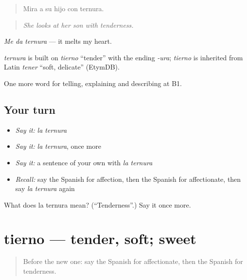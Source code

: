 \begin{quote}
Mira a su hijo con ternura.
\end{quote}

\begin{quote}
\emph{She looks at her son with tenderness.}
\end{quote}

\emph{Me da ternura} — it melts my heart.

\begin{cousinweb}
\emph{ternura} is built on \emph{tierno} \textquotedblleft{}tender\textquotedblright{} with the ending \emph{-ura}; \emph{tierno} is inherited from Latin \emph{tener} \textquotedblleft{}soft, delicate\textquotedblright{} (EtymDB).
\end{cousinweb}

\begin{grammarlens}[title={What you've built}]
One more word for telling, explaining and describing at B1.
\end{grammarlens}

\subsection*{Your turn}
\begin{itemize}
\raggedright
  \item \emph{Say it:} \emph{la ternura}
  \item \emph{Say it:} \emph{la ternura}, once more
  \item \emph{Say it:} a sentence of your own with \emph{la ternura}
  \item \emph{Recall:} say the Spanish for affection, then the Spanish for affectionate, then say \emph{la ternura} again
\end{itemize}

\begin{tcolorbox}[breakable,colback=teal!4,colframe=teal!35!black,title={Before you move on}]
What does la ternura mean? (\textquotedblleft{}Tenderness\textquotedblright{}.) Say it once more.
\end{tcolorbox}
\section[tierno]{tierno — tender, soft; sweet}

\label{lesson:ES-C714-tierno}



\begin{quote}
Before the new one: say the Spanish for affectionate, then the Spanish for tenderness.
\end{quote}

